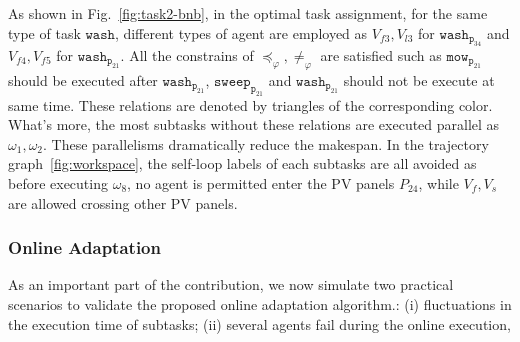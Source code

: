 As shown in Fig.~\ref{fig:task2-bnb},
in the optimal task assignment, for the same type of task $\texttt{wash}$,
different types of agent are employed as $V_{f3},V_{l3}$ for $\texttt{wash}_{\texttt{p}_{34}}$ and
 $V_{f4},V_{f5}$ for $\texttt{wash}_{\texttt{p}_{21}}$. All the constrains
 of $\preceq_\varphi,\neq_\varphi$ are satisfied such as $\texttt{mow}_{\texttt{p}_{21}}$
should be executed after $\texttt{wash}_{\texttt{p}_{21}}$,
$\texttt{sweep}_{\texttt{p}_{21}}$ and $\texttt{wash}_{\texttt{p}_{21}}$
should not be execute at same time. These relations are denoted by triangles of the corresponding color.
What's more, the most subtasks without these relations are executed parallel as $\omega_1,\omega_2$.
These parallelisms dramatically reduce the makespan.
In the trajectory graph~\ref{fig:workspace}, the self-loop labels of each subtasks are all avoided
as before executing $\omega_8$, no agent is permitted enter the PV panels $P_{24}$, while $V_f, V_s$ are allowed
crossing other PV panels.




\subsubsection{Online Adaptation}\label{subsubsec:exp-adapt}
As an important part of the contribution, we now simulate
two practical scenarios to validate the proposed online adaptation algorithm.:
(i) fluctuations in the execution time of subtasks;
(ii) several agents fail during the online execution,

